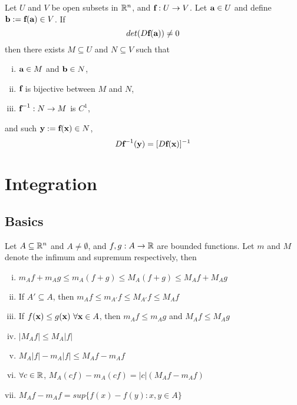 \documentclass[11pt]{article}
\begin{document}
			\begin{theorem}
				Let $U$ and $V$ be open subsets in $\mathbb{R}^n$, and $\textbf{f}: U \to V$. Let $\textbf{a} \in U$ and define $\textbf{b} := \textbf{f}(\textbf{a}) \in V$. If
				\begin{equation}
					det(D\textbf{f}(\textbf{a})) \neq 0
				\end{equation}
				then there exists $M \subseteq U$ and $N \subseteq V$ such that
				\begin{enumerate}[(i)]
					\item $\textbf{a} \in M$ and $\textbf{b} \in N$,
					\item $\textbf{f}$ is bijective between $M$ and $N$,
					\item $\textbf{f}^{-1}: N \to M$ is $C^1$,
				\end{enumerate}
					and  such $\textbf{y} := \textbf{f}(\textbf{x}) \in N$,
					\begin{equation}
						D \textbf{f}^{-1} (\textbf{y}) = [D \textbf{f} (\textbf{x})]^{-1}
					\end{equation}
			\end{theorem}
	
	\section{Integration}
		\subsection{Basics}
			\begin{theorem}
				Let $A \subseteq \mathbb{R}^n$ and $A \neq \emptyset$, and $f, g: A \to \mathbb{R}$ are bounded functions. Let $m$ and $M$ denote the infimum and supremum respectively, then
				\begin{enumerate}[(i)]
					\item $m_A f + m_A g \leq m_A (f+g) \leq M_A (f+g) \leq M_A f + M_A g$
					\item If $A' \subseteq A$, then $m_A f \leq m_{A'} f \leq M_{A'} f\leq M_A f$
					\item If $f(\textbf{x}) \leq g(\textbf{x})\ \forall \textbf{x} \in A$, then $m_A f \leq m_A g$ and $M_A f \leq M_A g$
					\item $|M_A f| \leq M_A |f|$
					\item $M_A |f| - m_A |f| \leq M_A f - m_A f$
					\item $\forall c \in \mathbb{R}$, $M_A (cf) - m_A (cf) = |c| (M_A f - m_A f)$
					\item $M_A f - m_A f = sup\{f(x) - f(y): x, y \in A\}$
				\end{enumerate}
			\end{theorem}
			
\end{document}

